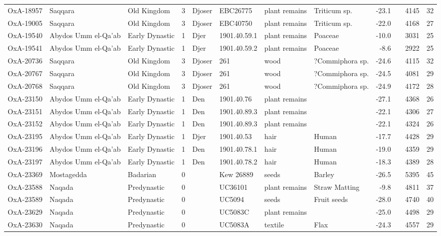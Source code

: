 \documentclass[a4paper,8pt]{article}
\begin{document}
\begin{landscape}
\begin{center}
\begin{longtable}{|l|>{\raggedright}p{20ex}|l|r|l|>{\raggedright}p{25ex}|l|l|r|l|r|r|}
OxA-18957 & Saqqara & Old Kingdom & 3 & Djoser & EBC26775 & plant remains & Triticum sp. & -23.1 &  & 4145 & 32\\
OxA-19005 & Saqqara & Old Kingdom & 3 & Djoser & EBC40750 & plant remains & Triticum sp. & -22.0 &  & 4168 & 27\\
OxA-19540 & Abydos Umm el-Qa'ab & Early Dynastic & 1 & Djer & 1901.40.59.1 & plant remains & Poaceae & -10.0 &  & 3031 & 25\\
OxA-19541 & Abydos Umm el-Qa'ab & Early Dynastic & 1 & Djer & 1901.40.59.2 & plant remains & Poaceae & -8.6 &  & 2922 & 25\\
OxA-20736 & Saqqara & Old Kingdom & 3 & Djoser & 261 & wood & ?Commiphora sp. & -24.6 &  & 4115 & 32\\
OxA-20767 & Saqqara & Old Kingdom & 3 & Djoser & 261 & wood & ?Commiphora sp. & -24.5 &  & 4081 & 29\\
OxA-20768 & Saqqara & Old Kingdom & 3 & Djoser & 261 & wood & ?Commiphora sp. & -24.9 &  & 4172 & 28\\
OxA-23150 & Abydos Umm el-Qa'ab & Early Dynastic & 1 & Den & 1901.40.76 & plant remains &  & -27.1 &  & 4368 & 26\\
OxA-23151 & Abydos Umm el-Qa'ab & Early Dynastic & 1 & Den & 1901.40.89.3 & plant remains &  & -22.1 &  & 4306 & 27\\
OxA-23152 & Abydos Umm el-Qa'ab & Early Dynastic & 1 & Den & 1901.40.89.3 & plant remains &  & -22.1 &  & 4324 & 26\\
OxA-23195 & Abydos Umm el-Qa'ab & Early Dynastic & 1 & Djer & 1901.40.53 & hair & Human & -17.7 &  & 4428 & 29\\
OxA-23196 & Abydos Umm el-Qa'ab & Early Dynastic & 1 & Den & 1901.40.78.1 & hair & Human & -19.0 &  & 4359 & 29\\
OxA-23197 & Abydos Umm el-Qa'ab & Early Dynastic & 1 & Den & 1901.40.78.2 & hair & Human & -18.3 &  & 4389 & 28\\
OxA-23369 & Mostagedda & Badarian & 0 &  & Kew 26889 & seeds & Barley & -26.5 &  & 5395 & 45\\
OxA-23588 & Naqada & Predynastic & 0 &  & UC36101 & plant remains & Straw Matting & -9.8 &  & 4811 & 37\\
OxA-23589 & Naqada & Predynastic & 0 &  & UC5094 & seeds & Fruit seeds & -28.0 &  & 4740 & 40\\
OxA-23629 & Naqada & Predynastic & 0 &  & UC5083C & plant remains &  & -25.0 &  & 4498 & 29\\
OxA-23630 & Naqada & Predynastic & 0 &  & UC5083A & textile & Flax & -24.3 &  & 4557 & 29\\

\end{longtable}
\end{center}
\end{landscape}
\end{document}
